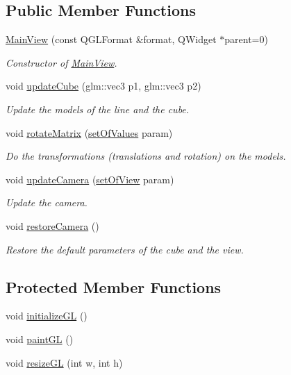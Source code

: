 \subsection*{Public Member Functions}
\begin{DoxyCompactItemize}
\item 
\hyperlink{class_main_view_a46ff460541fd6b9dfe75eeff6b78466a}{Main\+View} (const Q\+G\+L\+Format \&format, Q\+Widget $\ast$parent=0)
\begin{DoxyCompactList}\small\item\em Constructor of \hyperlink{class_main_view}{Main\+View}. \end{DoxyCompactList}\item 
void \hyperlink{class_main_view_a90f82be94e9397e1f12efbe1bd9dcc8a}{update\+Cube} (glm\+::vec3 p1, glm\+::vec3 p2)
\begin{DoxyCompactList}\small\item\em Update the models of the line and the cube. \end{DoxyCompactList}\item 
void \hyperlink{class_main_view_a4534f6ae9efa1c02922692dc06cc335a}{rotate\+Matrix} (\hyperlink{structset_of_values}{set\+Of\+Values} param)
\begin{DoxyCompactList}\small\item\em Do the transformations (translations and rotation) on the models. \end{DoxyCompactList}\item 
void \hyperlink{class_main_view_a3a3c5e12f747bb2226401c3cbd7618f6}{update\+Camera} (\hyperlink{structset_of_view}{set\+Of\+View} param)
\begin{DoxyCompactList}\small\item\em Update the camera. \end{DoxyCompactList}\item 
void \hyperlink{class_main_view_ad30cbdd44fc8711ec461bd268fe9d66a}{restore\+Camera} ()
\begin{DoxyCompactList}\small\item\em Restore the default parameters of the cube and the view. \end{DoxyCompactList}\end{DoxyCompactItemize}
\subsection*{Protected Member Functions}
\begin{DoxyCompactItemize}
\item 
void \hyperlink{class_main_view_aba66808352339bdf5f459d134181e4b0}{initialize\+GL} ()
\item 
void \hyperlink{class_main_view_a9b9be05c20817f6eb853bd58c406f0e0}{paint\+GL} ()
\item 
void \hyperlink{class_main_view_a8d8c7515e0a637a0db30608ebf489f1d}{resize\+GL} (int w, int h)
\end{DoxyCompactItemize}


